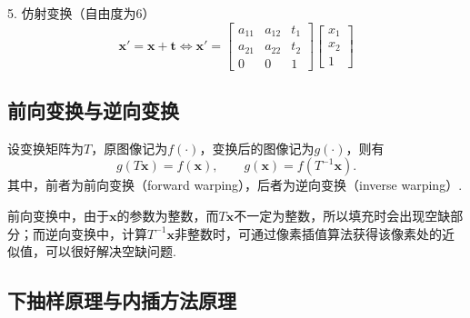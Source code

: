 \documentclass[12pt, a4paper, oneside]{ctexart}
\numberwithin{equation}{section}  %
\def\bd{\boldsymbol}        %
\begin{document}
5. 仿射变换（自由度为$6$）
\begin{equation*}
    \bd{x}' = \bd{x}+\bd{t}\iff \bd{x}' = \left[\begin{matrix}
        a_{11}&a_{12}&t_1\\
        a_{21}&a_{22}&t_2\\
        0&0&1
    \end{matrix}\right]\left[\begin{matrix}
        x_1\\x_2\\1
    \end{matrix}\right]
\end{equation*}
\subsection{前向变换与逆向变换}
设变换矩阵为$T$，原图像记为$f(\cdot)$，变换后的图像记为$g(\cdot)$，则有
\begin{equation*}
    g(T\bd{x}) = f(\bd{x}),\qquad g(\bd{x}) = f(T^{-1}\bd{x}).
\end{equation*}
其中，前者为前向变换（forward warping），后者为逆向变换（inverse warping）. 

前向变换中，由于$\bd{x}$的参数为整数，而$T\bd{x}$不一定为整数，所以填充时会出现空缺部分；而逆向变换中，计算$T^{-1}\bd{x}$非整数时，可通过像素插值算法获得该像素处的近似值，可以很好解决空缺问题.
\subsection{下抽样原理与内插方法原理}
\end{document}

